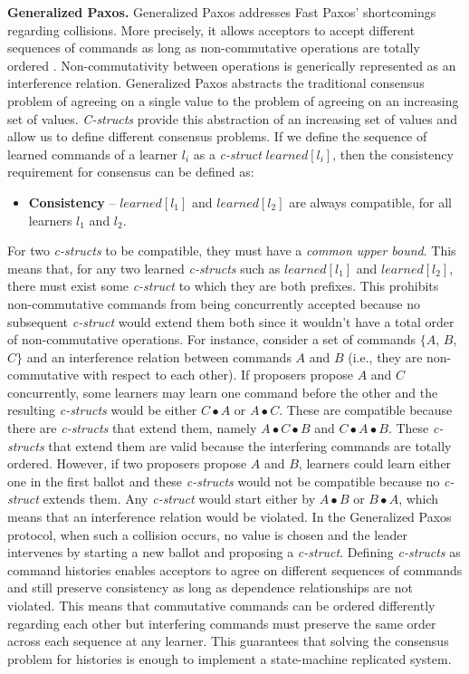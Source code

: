 \textbf{Generalized Paxos.} Generalized Paxos addresses Fast Paxos' shortcomings regarding collisions. More precisely, it allows acceptors to accept different sequences of commands as long as non-commutative operations are totally ordered \cite{Lamport2005}.  Non-commutativity between operations is generically represented as an interference relation. Generalized Paxos abstracts the traditional consensus problem of agreeing on a single value to the problem of agreeing on an increasing set of values. \textit{C-structs} provide this abstraction of an increasing set of values and allow us to define different consensus problems. If we define the sequence of learned commands of a learner $l_i$ as a \textit{c-struct} $learned[l_i]$, then the consistency requirement for consensus can be defined as:
\begin{itemize}
\item \textbf{Consistency} -- $learned[l_1]$ and $learned[l_2]$ are always compatible, for all learners $l_1$ and $l_2$.
\end{itemize}
For two \textit{c-structs} to be compatible, they must have a \textit{common upper bound}. This means that, for any two learned \textit{c-structs} such as $learned[l_1]$ and $learned[l_2]$, there must exist some \textit{c-struct} to which they are both prefixes. This prohibits non-commutative commands from being concurrently accepted because no subsequent \textit{c-struct} would extend them both since it wouldn't have a total order of non-commutative operations. For instance, consider a set of commands $\lbrace A$, $B$, $C\rbrace$ and an interference relation between commands $A$ and $B$ (i.e., they are non-commutative with respect to each other). If proposers propose $A$ and $C$ concurrently, some learners may learn one command before the other and the resulting \textit{c-structs} would be either $C \bullet A$ or $A \bullet C$. These are compatible because there are \textit{c-structs} that extend them, namely $A \bullet C \bullet B$ and $C \bullet A \bullet B$. These \textit{c-structs} that extend them are valid because the interfering commands are totally ordered. However, if two proposers propose $A$ and $B$, learners could learn either one in the first ballot and these \textit{c-structs} would not be compatible because no \textit{c-struct} extends them. Any \textit{c-struct} would start either by $A \bullet B$ or $B \bullet A$, which means that an interference relation would be violated. In the Generalized Paxos protocol, when such a collision occurs, no value is chosen and the leader intervenes by starting a new ballot and proposing a \textit{c-struct}. Defining \textit{c-structs} as command histories enables acceptors to agree on different sequences of commands and still preserve consistency as long as dependence relationships are not violated. This means that commutative commands can be ordered differently regarding each other but interfering commands must preserve the same order across each sequence at any learner. This guarantees that solving the consensus problem for histories is enough to implement a state-machine replicated system. \par
